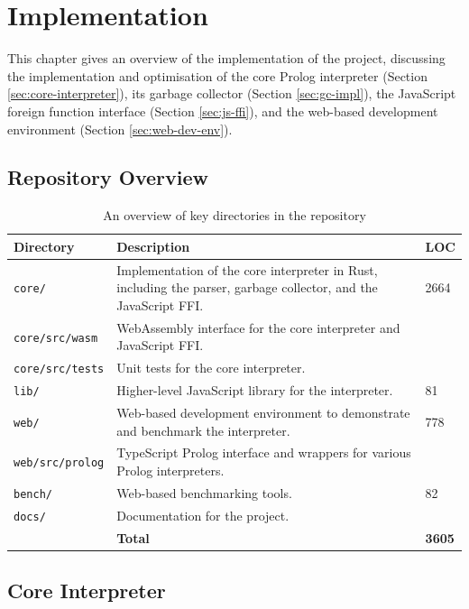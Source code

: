 \chapter{Implementation}

This chapter gives an overview of the implementation of the project, discussing the implementation and optimisation of the core Prolog interpreter (Section \ref{sec:core-interpreter}), its garbage collector (Section \ref{sec:gc-impl}), the JavaScript foreign function interface (Section \ref{sec:js-ffi}), and the web-based development environment (Section \ref{sec:web-dev-env}).

\section{Repository Overview}

\begin{table}[H]
\centering
\begin{tabular}{lp{11cm}l}
\hline
\textbf{Directory} & \textbf{Description} & \textbf{LOC} \\
\hline
\texttt{core/} & Implementation of the core interpreter in Rust, including the parser, garbage collector, and the JavaScript FFI. & 2664 \\
\texttt{core/src/wasm} & WebAssembly interface for the core interpreter and JavaScript FFI. & \\
\texttt{core/src/tests} & Unit tests for the core interpreter. & \\
\texttt{lib/} & Higher-level JavaScript library for the interpreter. & 81 \\
\texttt{web/} & Web-based development environment to demonstrate and benchmark the interpreter. & 778 \\
\texttt{web/src/prolog} & TypeScript Prolog interface and wrappers for various Prolog interpreters. & \\
\texttt{bench/} & Web-based benchmarking tools. & 82 \\
\texttt{docs/} & Documentation for the project. & \\
\hline
& \hfill \textbf{Total} & \textbf{3605} \\
\hline
\end{tabular}
\caption{An overview of key directories in the repository}
\label{tab:repository-overview}
\end{table}

\section{Core Interpreter}

